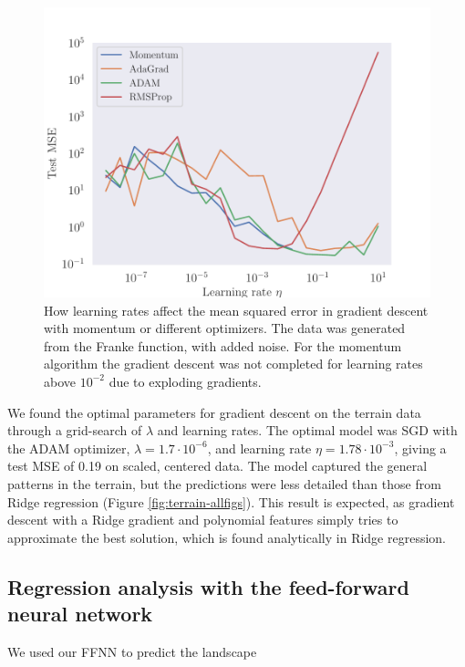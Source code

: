 \begin{figure}
    \centering
    \includegraphics[width=0.99\linewidth]{examples/tests_even/figs/Franke-learningrates-optimizers.pdf}
    \caption{How learning rates affect the mean squared error in gradient descent with momentum or different optimizers. The data was generated from the Franke function, with added noise. For the momentum algorithm the gradient descent was not completed for learning rates above $10^{-2}$ due to exploding gradients.}
    \label{fig:franke-learningrate}
\end{figure}

We found the optimal parameters for gradient descent on the terrain data through a grid-search of $\lambda$ and learning rates. The optimal model was SGD with the ADAM optimizer, $\lambda=1.7\cdot10^{-6}$, and learning rate $\eta=1.78\cdot10^{-3}$, giving a test MSE of 0.19 on scaled, centered data. The model captured the general patterns in the terrain, but the predictions were less detailed than those from Ridge regression (Figure \ref{fig:terrain-allfigs}). This result is expected, as gradient descent with a Ridge gradient and polynomial features simply tries to approximate the best solution, which is found analytically in Ridge regression.

\subsection{Regression analysis with the feed-forward neural network}

We used our FFNN to predict the landscape

